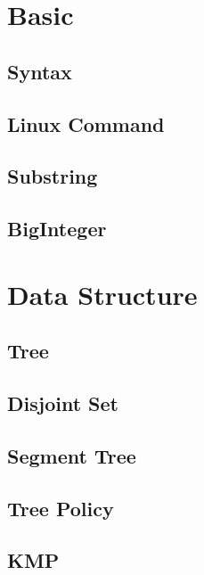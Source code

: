 \section{Basic}

\subsection{Syntax}


\subsection{Linux Command}


\subsection{Substring}


\subsection{BigInteger}

\section{Data Structure}

\subsection{Tree}


\subsection{Disjoint Set}


\subsection{Segment Tree}


\subsection{Tree Policy}


\subsection{KMP}


